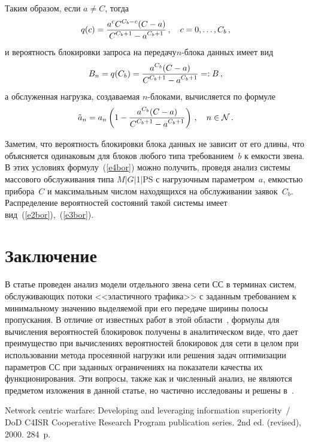 \begin{multicols}{2}
  Таким образом, если $a\not= C$, тогда
  $$
  q(c) = \displaystyle\frac{\displaystyle a^c C^{C_b-c} (C-a)\mathstrut}{\displaystyle C^{C_b+1} -a^{C_b+1}\mathstrut}\,,\quad c=0,\ldots 
,C_b\,,
  $$
и вероятность блокировки запроса на передачу\linebreak $n$-бло\-ка данных имеет вид
\begin{equation}
B_n = q(C_b) =\displaystyle\frac{\displaystyle a^{C_b} (C-a)\mathstrut}{\displaystyle C^{C_b+1} -a^{C_b+1}\mathstrut} =: B\,,
\label{e4bor}
\end{equation}
а обслуженная нагрузка, создаваемая $n$-блоками, вычисляется по формуле
$$
\tilde{a}_n = a_n\left ( 1-\displaystyle\frac{\displaystyle a^{C_b} (C-a)\mathstrut}{\displaystyle C^{C_b+1} -a^{C_b+1}\mathstrut}\right 
)\,,\quad n\in {\mathcal N}\,.
$$
  
  Заметим, что вероятность блокировки блока данных не зависит от его длины, 
что объясняется одинаковым для блоков любого типа требованием~$b$ к 
емкости звена. В этих условиях формулу~(\ref{e4bor}) можно получить, 
проведя анализ системы массового обслуживания типа 
$M$$\vert$$G$$\vert$1$\vert$PS с нагрузочным параметром~$a$, емкостью 
прибора~$C$ и максимальным числом находящихся на обслуживании 
заявок~$C_b$. Распределение вероятностей состояний такой сис\-те\-мы имеет 
вид~(\ref{e2bor}),~(\ref{e3bor}).
  
  \section{Заключение}
  
  В статье проведен анализ модели отдельного звена сети СС 
  в терминах систем, обслуживающих потоки <<эластичного трафика>> 
с заданным требованием к минимальному значению выделяемой при его 
передаче ширины полосы пропускания. В отличие от известных работ в этой 
области~\cite{6bor, 7bor}, формулы для вычисления вероятностей блокировок 
получены в аналитическом виде, что дает преимущество при вычислениях 
вероятностей блокировок для сети в целом при использовании метода 
просеянной нагрузки или решения задач оптимизации па\-ра\-мет\-ров 
СС при  заданных ограничениях на показатели качества 
их функционирования. Эти вопросы, также как и численный анализ, не 
являются предметом изложения в данной статье, но частично исследованы и 
решены в~\cite{5bor}.

{\small\frenchspacing
{%
\begin{thebibliography}{99}    
  
  Network centric warfare: Developing and leveraging information superiority~/ 
DoD C4ISR Cooperative Research Program publication series. 2nd ed. (revised), 
2000. 284~p.
  

\end{thebibliography}}}
\end{multicols}
